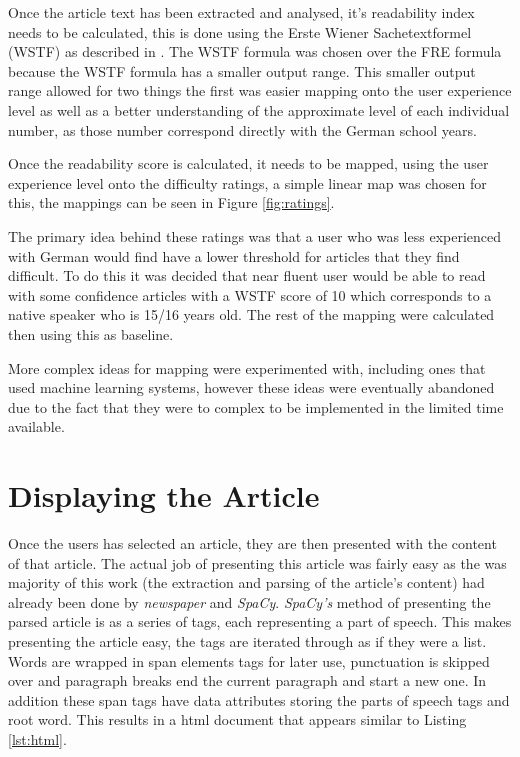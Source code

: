 Once the article text has been extracted and analysed, it's readability index needs to be calculated, this is done using the Erste Wiener Sachetextformel (WSTF) as described in \textcite{bamberger1984}. The WSTF formula was chosen over the FRE formula because the WSTF formula has a smaller output range. This smaller output range allowed for two things the first was easier mapping onto the user experience level as well as a better understanding of the approximate level of each individual number, as those number correspond directly with the German school years. 

Once the readability score is calculated, it needs to be mapped, using the user experience level onto the difficulty ratings, a simple linear map was chosen for this, the mappings can be seen in Figure \ref{fig:ratings}.



The primary idea behind these ratings was that a user who was less experienced with German would find have a lower threshold for articles that they find difficult. To do this it was decided that near fluent user would be able to read with some confidence articles with a WSTF score of 10 which corresponds to a native speaker who is 15/16 years old. The rest of the mapping were calculated then using this as baseline. 

More complex ideas for mapping were experimented with, including ones that used machine learning systems, however these ideas were eventually abandoned due to the fact that they were to complex to be implemented in the limited time available. 

\section{Displaying the Article}

Once the users has selected an article, they are then presented with the content of that article. The actual job of presenting this article was fairly easy as the was majority of this work (the extraction and parsing of the article's content) had already been done by \textit{newspaper} and \textit{SpaCy}.  \textit{SpaCy's} method of presenting the parsed article is as a series of tags, each representing a part of speech. This makes presenting the article easy, the tags are iterated through as if they were a list. Words are wrapped in span elements tags for later use, punctuation is skipped over and paragraph breaks end the current paragraph and start a new one. In addition these span tags have data attributes storing the parts of speech tags and root word. This results in a html document that appears similar to Listing \ref{lst:html}.

